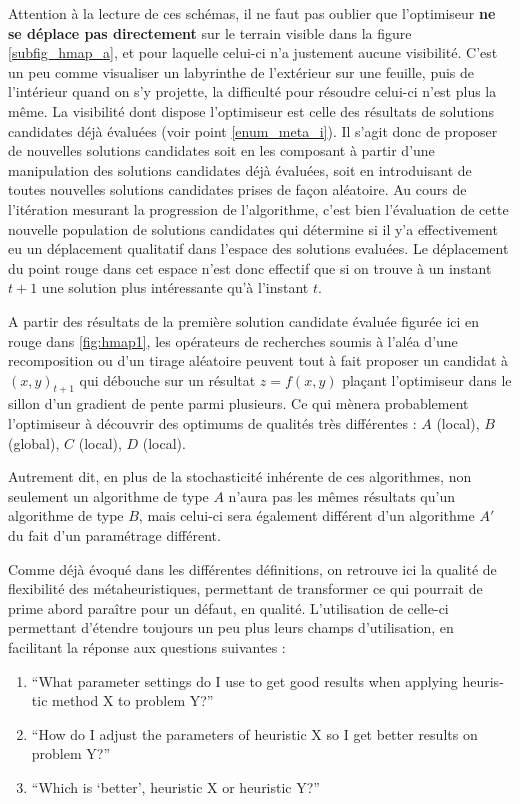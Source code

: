 Attention à la lecture de ces schémas, il ne faut pas oublier que l'optimiseur \textbf{ne se déplace pas directement} sur le terrain visible dans la figure \ref{subfig_hmap_a}, et pour laquelle celui-ci n'a justement aucune visibilité. C'est un peu comme visualiser un labyrinthe de l'extérieur sur une feuille, puis de l'intérieur quand on s'y projette, la difficulté pour résoudre celui-ci n'est plus la même. La visibilité dont dispose l'optimiseur est celle des résultats de solutions candidates déjà évaluées (voir point \ref{enum_meta_i}). Il s'agit donc de proposer de nouvelles solutions candidates soit en les composant à partir d'une manipulation des solutions candidates déjà évaluées, soit en introduisant de toutes nouvelles solutions candidates prises de façon aléatoire. Au cours de l'itération mesurant la progression de l'algorithme, c'est bien l'évaluation de cette nouvelle population de solutions candidates qui détermine si il y'a effectivement eu un déplacement qualitatif dans l'espace des solutions evaluées. Le déplacement du point rouge dans cet espace n'est donc effectif que si on trouve à un instant $t + 1$ une solution plus intéressante qu'à l'instant $t$.

A partir des résultats de la première solution candidate évaluée figurée ici en rouge dans \ref{fig:hmap1}, les opérateurs de recherches soumis à l'aléa d'une recomposition ou d'un tirage aléatoire peuvent tout à fait proposer un candidat à $(x,y)_{t+1}$ qui débouche sur un résultat $z = f(x,y)$ plaçant l'optimiseur dans le sillon d'un gradient de pente parmi plusieurs. Ce qui mènera probablement l'optimiseur à découvrir des optimums de qualités très différentes : $A$ (local), $B$ (global), $C$ (local), $D$ (local).

Autrement dit, en plus de la stochasticité inhérente de ces algorithmes, non seulement un algorithme de type $A$ n'aura pas les mêmes résultats qu'un algorithme de type $B$, mais celui-ci sera également différent d'un algorithme $A'$ du fait d'un paramétrage différent.

Comme déjà évoqué dans les différentes définitions, on retrouve ici la qualité de flexibilité des métaheuristiques, permettant de transformer ce qui pourrait de prime abord paraître pour un défaut, en qualité. L'utilisation de celle-ci permettant d'étendre toujours un peu plus leurs champs d'utilisation, en facilitant la réponse aux questions suivantes :
\begin{enumerate}
\item  \foreignquote{english}{What parameter settings do I use to get good results when applying heuristic method X to problem Y?}
\item  \foreignquote{english}{How do I adjust the parameters of heuristic X so I get better results on problem Y?}
\item \foreignquote{english}{Which is \enquote{better}, heuristic X or heuristic Y?}
\end{enumerate}

